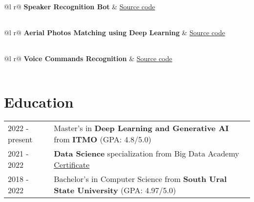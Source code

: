 \documentclass[a4paper,12pt]{article}
\begin{document}
\begin{tabularx}{\linewidth}{ @{}l r@{} }
\textbf{Speaker Recognition Bot} & \hfill \href{https://github.com/traptrip/speaker_recognition_bot}{Source code} \\[3.75pt]
  \\
\end{tabularx}

\begin{tabularx}{\linewidth}{ @{}l r@{} }
\textbf{Aerial Photos Matching using Deep Learning} & \hfill \href{https://github.com/traptrip/ai-areal-photo}{Source code} \\[3.75pt]
  \\
\end{tabularx}

\begin{tabularx}{\linewidth}{ @{}l r@{} }
\textbf{Voice Commands Recognition} & \hfill \href{https://github.com/traptrip/Speech_commands_recognition}{Source code} \\[3.75pt]
  \\
\end{tabularx}


\section{Education}
\begin{tabularx}{\linewidth}{@{}l X@{}}	
2022 - present & Master's in \textbf{Deep Learning and Generative AI} from \textbf{ITMO} \hfill \normalsize (GPA: 4.8/5.0) \\
2021 - 2022 & \textbf{Data Science} specialization from Big Data Academy \hfill \normalsize \href{https://data.vk.company/curriculum/certificates/download/5013/d55bb369-58ba-46e3-b9e3-9202797b0bee/}{Certificate}\\
2018 - 2022 & Bachelor's in Computer Science from \textbf{South Ural State University} \hfill \normalsize  (GPA: 4.97/5.0) \\ 

\end{tabularx}
\end{document}
